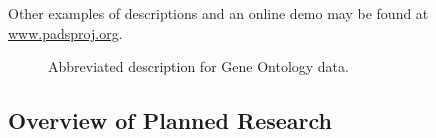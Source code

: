 \documentclass[11pt]{article}
\begin{document}
Other examples of \pads{} descriptions and an online demo may be
found at \url{www.padsproj.org}.

\begin{figure}[t]


%

\caption{Abbreviated \pads{} description for Gene Ontology data.}
\label{figure:dibbler}
\end{figure}



% 


% 

\subsection{Overview of Planned Research}
\label{ssec:sow}
\end{document}
